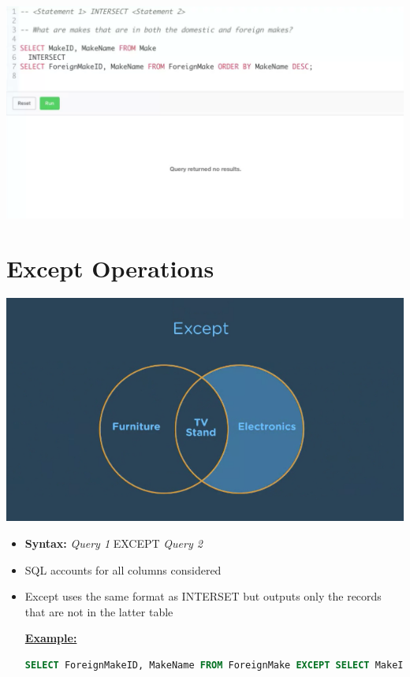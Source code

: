 \documentclass[12pt]{article}
\begin{document}
\begin{itemize}
    \begin{center}
    \includegraphics[width=\linewidth]{images/part_5_notes_5.png}
    \end{center}
\end{itemize}

\bigskip

\section{Except Operations}

\bigskip

\begin{center}
\includegraphics[width=0.8\linewidth]{images/part_5_notes_6.png}
\end{center}


\begin{itemize}
    \item \textbf{Syntax:} \textit{Query 1} EXCEPT \textit{Query 2}
    \item SQL accounts for all columns considered
    \item Except uses the same format as INTERSET but outputs only the records
    that are not in the latter table

    \bigskip

    \underline{\textbf{Example:}}

    \bigskip

    \begin{lstlisting}[language=SQL]
    SELECT ForeignMakeID, MakeName FROM ForeignMake EXCEPT SELECT MakeID, MakeName FROM Make; // shows only forien made goods
    \end{lstlisting}
\end{itemize}
\end{document}
